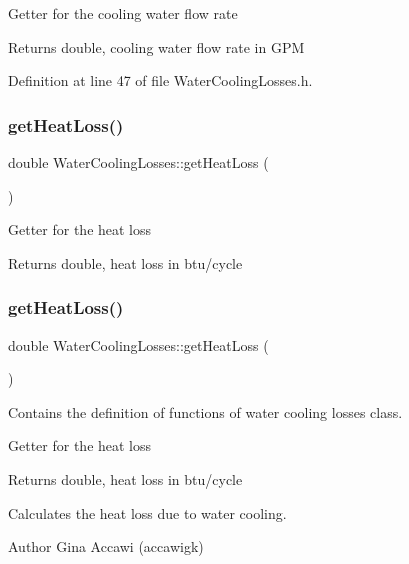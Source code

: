 Getter for the cooling water flow rate \begin{DoxyReturn}{Returns}
double, cooling water flow rate in G\+PM 
\end{DoxyReturn}


Definition at line 47 of file Water\+Cooling\+Losses.\+h.

\mbox{\label{class_water_cooling_losses_a8f884cc70d7af7add5bb1be7f837384c}} 
\subsubsection{\texorpdfstring{get\+Heat\+Loss()}{getHeatLoss()}\hspace{0.1cm}{\footnotesize\ttfamily [1/3]}}
{\footnotesize\ttfamily double Water\+Cooling\+Losses\+::get\+Heat\+Loss (\begin{DoxyParamCaption}{ }\end{DoxyParamCaption})}

Getter for the heat loss \begin{DoxyReturn}{Returns}
double, heat loss in btu/cycle 
\end{DoxyReturn}
\mbox{\label{class_water_cooling_losses_a8f884cc70d7af7add5bb1be7f837384c}} 
\subsubsection{\texorpdfstring{get\+Heat\+Loss()}{getHeatLoss()}\hspace{0.1cm}{\footnotesize\ttfamily [2/3]}}
{\footnotesize\ttfamily double Water\+Cooling\+Losses\+::get\+Heat\+Loss (\begin{DoxyParamCaption}{ }\end{DoxyParamCaption})}



Contains the definition of functions of water cooling losses class. 

Getter for the heat loss \begin{DoxyReturn}{Returns}
double, heat loss in btu/cycle
\end{DoxyReturn}
Calculates the heat loss due to water cooling. \begin{DoxyAuthor}{Author}
Gina Accawi (accawigk) 
\end{DoxyAuthor}


